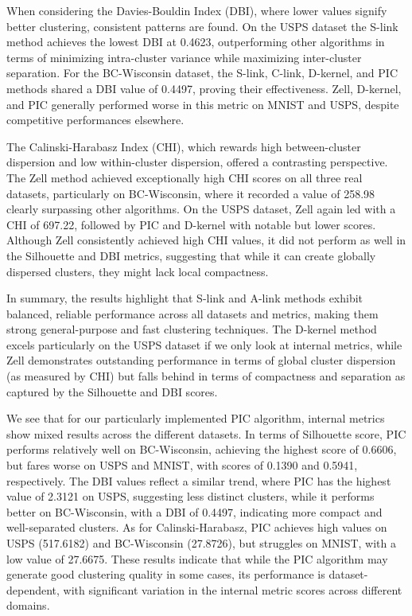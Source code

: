 \documentclass[
	10pt,
	parskip=half-,	
	paper=a4,
	english
	]{scrartcl}
\begin{document}
When considering the Davies-Bouldin Index (DBI), where lower values signify better clustering, consistent patterns are found. On the USPS dataset the S-link method achieves the lowest DBI at 0.4623, outperforming other algorithms in terms of minimizing intra-cluster variance while maximizing inter-cluster separation. For the BC-Wisconsin dataset, the S-link, C-link, D-kernel, and PIC methods shared a DBI value of 0.4497, proving their effectiveness. Zell, D-kernel, and PIC generally performed worse in this metric on MNIST and USPS, despite competitive performances elsewhere.

The Calinski-Harabasz Index (CHI), which rewards high between-cluster dispersion and low within-cluster dispersion, offered a contrasting perspective. The Zell method achieved exceptionally high CHI scores on all three real datasets, particularly on BC-Wisconsin, where it recorded a value of 258.98 clearly surpassing other algorithms. On the USPS dataset, Zell again led with a CHI of 697.22, followed by PIC and D-kernel with notable but lower scores. Although Zell consistently achieved high CHI values, it did not perform as well in the Silhouette and DBI metrics, suggesting that while it can create globally dispersed clusters, they might lack local compactness.

In summary, the results highlight that S-link and A-link methods exhibit balanced, reliable performance across all datasets and metrics, making them strong general-purpose and fast clustering techniques. The D-kernel method excels particularly on the USPS dataset if we only look at internal metrics, while Zell demonstrates outstanding performance in terms of global cluster dispersion (as measured by CHI) but falls behind in terms of compactness and separation as captured by the Silhouette and DBI scores.

We see that for our particularly implemented PIC algorithm, internal metrics show mixed results across the different datasets. In terms of Silhouette score, PIC performs relatively well on BC-Wisconsin, achieving the highest score of 0.6606, but fares worse on USPS and MNIST, with scores of 0.1390 and 0.5941, respectively. The DBI values reflect a similar trend, where PIC has the highest value of 2.3121 on USPS, suggesting less distinct clusters, while it performs better on BC-Wisconsin, with a DBI of 0.4497, indicating more compact and well-separated clusters. As for Calinski-Harabasz, PIC achieves high values on USPS (517.6182) and BC-Wisconsin (27.8726), but struggles on MNIST, with a low value of 27.6675. These results indicate that while the PIC algorithm may generate good clustering quality in some cases, its performance is dataset-dependent, with significant variation in the internal metric scores across different domains.
\end{document}
